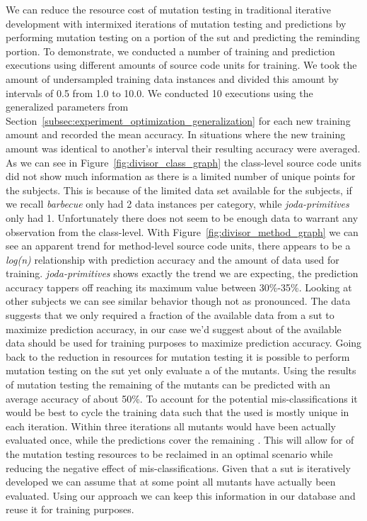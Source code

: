 We can reduce the resource cost of mutation testing in traditional iterative development with intermixed iterations of mutation testing and predictions by performing mutation testing on a portion of the \gls{sut} and predicting the reminding portion. To demonstrate, we conducted a number of training and prediction executions using different amounts of source code units for training. We took the amount of undersampled training data instances and divided this amount by intervals of 0.5 from 1.0 to 10.0. We conducted 10 executions using the generalized parameters from Section~\ref{subsec:experiment_optimization_generalization} for each new training amount and recorded the mean accuracy. In situations where the new training amount was identical to another's interval their resulting accuracy were averaged. As we can see in Figure~\ref{fig:divisor_class_graph} the class-level source code units did not show much information as there is a limited number of unique points for the subjects. This is because of the limited data set available for the subjects, if we recall \emph{barbecue} only had 2 data instances per category, while \emph{joda-primitives} only had 1. Unfortunately there does not seem to be enough data to warrant any observation from the class-level. With Figure~\ref{fig:divisor_method_graph} we can see an apparent trend for method-level source code units, there appears to be a \emph{log(n)} relationship with prediction accuracy and the amount of data used for training. \emph{joda-primitives} shows exactly the trend we are expecting, the prediction accuracy tappers off reaching its maximum value between 30\%-35\%. Looking at other subjects we can see similar behavior though not as pronounced. The data suggests that we only required a fraction of the available data from a \gls{sut} to maximize prediction accuracy, in our case we'd suggest about  of the available data should be used for training purposes to maximize prediction accuracy. Going back to the reduction in resources for mutation testing it is possible to perform mutation testing on the \gls{sut} yet only evaluate a  of the mutants. Using the results of mutation testing the remaining  of the mutants can be predicted with an average accuracy of about 50\%. To account for the potential mis-classifications it would be best to cycle the training data such that the  used is mostly unique in each iteration. Within three iterations all mutants would have been actually evaluated once, while the predictions cover the remaining . This will allow for  of the mutation testing resources to be reclaimed in an optimal scenario while reducing the negative effect of mis-classifications. Given that a \gls{sut} is iteratively developed we can assume that at some point all mutants have actually been evaluated. Using our approach we can keep this information in our database and reuse it for training purposes.


